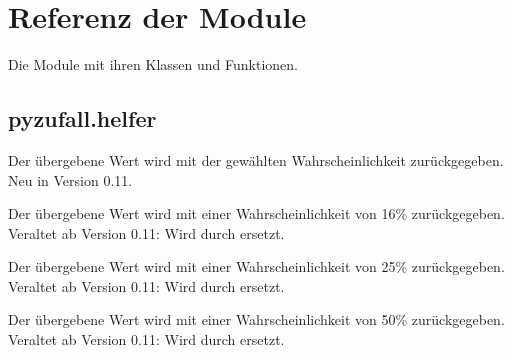 \documentclass[a4paper,12pt,oneside]{sphinxmanual}
\begin{document}
\chapter{Referenz der Module}
\label{module:referenz-der-module}\label{module::doc}
Die Module mit ihren Klassen und Funktionen.


\section{pyzufall.helfer}
\label{module:pyzufall-helfer}\label{module:module-pyzufall.helfer}

\begin{fulllineitems}
\label{module:pyzufall.helfer.chance}
Der übergebene Wert wird mit der gewählten Wahrscheinlichkeit zurückgegeben.
Neu in Version 0.11.
\end{fulllineitems}


\begin{fulllineitems}
\label{module:pyzufall.helfer.e16}
Der übergebene Wert wird mit einer Wahrscheinlichkeit von 16\% zurückgegeben.
Veraltet ab Version 0.11: Wird durch {\hyperref[module:pyzufall.helfer.chance]{}} ersetzt.
\end{fulllineitems}


\begin{fulllineitems}
\label{module:pyzufall.helfer.e25}
Der übergebene Wert wird mit einer Wahrscheinlichkeit von 25\% zurückgegeben.
Veraltet ab Version 0.11: Wird durch {\hyperref[module:pyzufall.helfer.chance]{}} ersetzt.
\end{fulllineitems}


\begin{fulllineitems}
\label{module:pyzufall.helfer.e50}
Der übergebene Wert wird mit einer Wahrscheinlichkeit von 50\% zurückgegeben.
Veraltet ab Version 0.11: Wird durch {\hyperref[module:pyzufall.helfer.chance]{}} ersetzt.
\end{fulllineitems}
\end{document}
